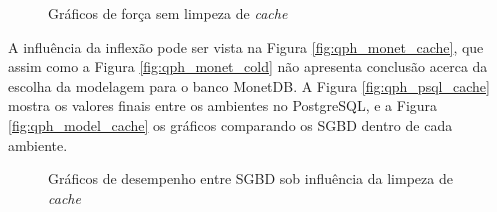 \begin{figure}[htpb]
        \centering
        \caption{Gráficos de força sem limpeza de \textit{cache}}
        \label{fig:power_cache_2}
\end{figure}

A influência da inflexão pode ser vista na Figura \ref{fig:qph_monet_cache}, que assim como a Figura \ref{fig:qph_monet_cold} não apresenta conclusão acerca da escolha da modelagem para o banco MonetDB. A Figura \ref{fig:qph_psql_cache} mostra os valores finais entre os ambientes no PostgreSQL, e a Figura \ref{fig:qph_model_cache} os gráficos comparando os SGBD dentro de cada ambiente.
    
\begin{figure}[htpb]
        \centering
        \caption{Gráficos de desempenho entre SGBD sob influência da limpeza de \textit{cache}}
        \label{fig:qph_sgbd_cache}
\end{figure}

